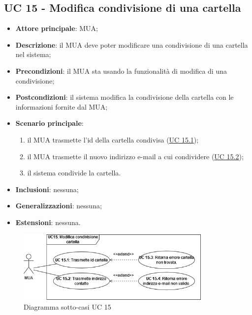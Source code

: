\subsection{UC 15 - Modifica condivisione di una cartella} \label{sec:UC15}

    \begin{itemize}
        \item \textbf{Attore principale}: MUA;
        \item \textbf{Descrizione}: il MUA deve poter modificare una condivisione di una cartella nel sistema;
        \item \textbf{Precondizioni}: il MUA sta usando la funzionalità di modifica di una condivisione;
        \item \textbf{Postcondizioni}: il sistema modifica la condivisione della cartella con le informazioni fornite dal MUA;
        \item \textbf{Scenario principale}:
            \begin{enumerate}
                \item il MUA trasmette l'id della cartella condivisa (\hyperref[sec:UC15.1]{UC 15.1});
                \item il MUA trasmette il nuovo indirizzo e-mail a cui condividere (\hyperref[sec:UC15.2]{UC 15.2});
                \item il sistema condivide la cartella.
            \end{enumerate}
        \item \textbf{Inclusioni}: nessuna;
        \item \textbf{Generalizzazioni}: nessuna;
        \item \textbf{Estensioni}: nessuna.
    \end{itemize}

    \begin{figure}[H]
        \includegraphics[width=0.85\textwidth]{sections/uc_imgs/UC15.png}
        \centering
        \caption{Diagramma sotto-casi UC 15}
    \end{figure}

